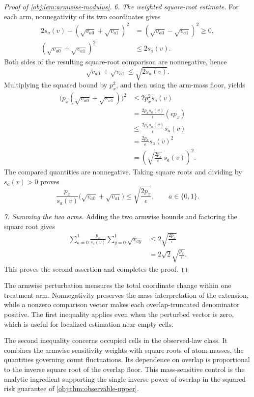 \documentclass[11pt]{article}
\begin{document}
\begin{proof}[Proof of \cref{obj:lem:armwise-modulus}]
\emph{6. The weighted square-root estimate.}
For each arm, nonnegativity of its two coordinates gives
\[
\begin{aligned}
2s_a(v)-(\sqrt{v_{a0}}+\sqrt{v_{a1}})^2
&=(\sqrt{v_{a0}}-\sqrt{v_{a1}})^2\geq0,\\
(\sqrt{v_{a0}}+\sqrt{v_{a1}})^2
&\leq2s_a(v).
\end{aligned}
\]
Both sides of the resulting square-root comparison are nonnegative, hence
\[
\sqrt{v_{a0}}+\sqrt{v_{a1}}\leq\sqrt{2s_a(v)}.
\]
Multiplying the squared bound by \(p_x^2\), and then using the arm-mass floor, yields
\[
\begin{aligned}
\bigl(p_x(\sqrt{v_{a0}}+\sqrt{v_{a1}})\bigr)^2
&\leq2p_x^2s_a(v)\\
&=\frac{2p_xs_a(v)}{\epsilon}(\epsilon p_x)\\
&\leq\frac{2p_xs_a(v)}{\epsilon}s_a(v)\\
&=\frac{2p_x}{\epsilon}s_a(v)^2\\
&=\left(\sqrt{\frac{2p_x}{\epsilon}}\,s_a(v)\right)^2.
\end{aligned}
\]
The compared quantities are nonnegative. Taking square roots and dividing by \(s_a(v)>0\) proves
\[
\frac{p_x}{s_a(v)}
\bigl(\sqrt{v_{a0}}+\sqrt{v_{a1}}\bigr)
\leq\sqrt{\frac{2p_x}{\epsilon}},
\qquad a\in\{0,1\}.
\]

\emph{7. Summing the two arms.}
Adding the two armwise bounds and factoring the square root gives
\[
\begin{aligned}
\sum_{a=0}^1\frac{p_x}{s_a(v)}
\sum_{y=0}^1\sqrt{v_{ay}}
&\leq2\sqrt{\frac{2p_x}{\epsilon}}\\
&=2\sqrt{2}\sqrt{\frac{p_x}{\epsilon}}.
\end{aligned}
\]
This proves the second assertion and completes the proof.
\end{proof}

The armwise perturbation  measures the total coordinate change within one treatment arm. Nonnegativity preserves the mass interpretation of the extension, while a nonzero comparison vector makes each overlap-truncated denominator positive. The first inequality applies even when the perturbed vector is zero, which is useful for localized estimation near empty cells.

The second inequality concerns occupied cells in the observed-law class. It combines the armwise sensitivity weights with square roots of atom masses, the quantities governing count fluctuations. Its dependence on overlap is proportional to the inverse square root of the overlap floor. This mass-sensitive control is the analytic ingredient supporting the single inverse power of overlap in the squared-risk guarantee of \cref{obj:thm:observable-upper}.
\end{document}
